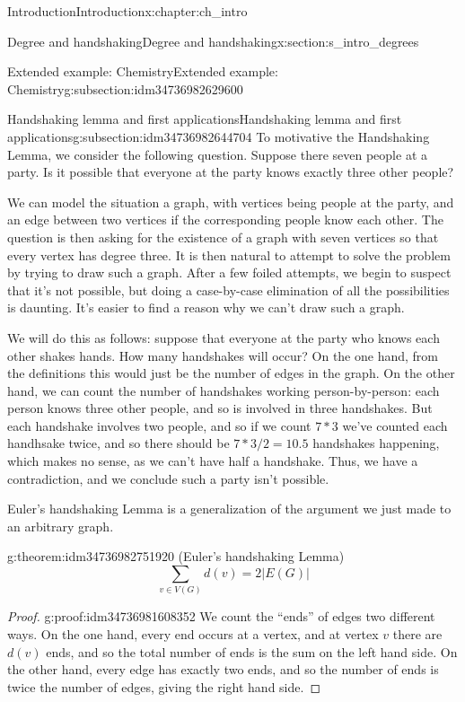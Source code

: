 \documentclass[oneside,10pt,]{book}
\numberwithin{equation}{section}
\begin{document}
\begin{chapterptx}{Introduction}{}{Introduction}{}{}{x:chapter:ch_intro}
\begin{sectionptx}{Degree and handshaking}{}{Degree and handshaking}{}{}{x:section:s_intro_degrees}
\begin{subsectionptx}{Extended example: Chemistry}{}{Extended example: Chemistry}{}{}{g:subsection:idm34736982629600}
%
\end{subsectionptx}
%
%
\typeout{************************************************}
\typeout{************************************************}
%
\begin{subsectionptx}{Handshaking lemma and first applications}{}{Handshaking lemma and first applications}{}{}{g:subsection:idm34736982644704}
To motivative the Handshaking Lemma, we consider the following question.  Suppose there seven people at a party.  Is it possible that everyone at the party knows exactly three other people?%
\par
We can model the situation a graph, with vertices being people at the party, and an edge between two vertices if the corresponding people know each other.  The question is then asking for the existence of a graph with seven vertices so that every vertex has degree three.  It is then natural to attempt to solve the problem by trying to draw such a graph.  After a few foiled attempts, we begin to suspect that it's not possible, but doing a case-by-case elimination of all the possibilities is daunting.  It's easier to find a reason why we can't draw such a graph.%
\par
We will do this as follows: suppose that everyone at the party who knows each other shakes hands.  How many handshakes will occur?  On the one hand, from the definitions this would just be the number of edges in the graph.  On the other hand, we can count the number of handshakes working person-by-person: each person knows three other people, and so is involved in three handshakes.  But each handshake involves two people, and so if we count \(7*3\) we've counted each handhsake twice, and so there should be \(7*3/2=10.5\) handshakes happening, which makes no sense, as we can't have half a handshake.  Thus, we have a contradiction, and we conclude such a party isn't possible.%
\par
Euler's handshaking Lemma is a generalization of the argument we just made to an arbitrary graph.%
\begin{theorem}{}{}{g:theorem:idm34736982751920}%
(Euler's handshaking Lemma)%
%
\begin{equation*}
\sum_{v\in V(G)}d(v)=2|E(G)|
\end{equation*}
\end{theorem}
\begin{proof}{}{g:proof:idm34736981608352}
We count the ``ends'' of edges two different ways.  On the one hand, every end occurs at a vertex, and at vertex \(v\) there are \(d(v)\) ends, and so the total number of ends is the sum on the left hand side. On the other hand, every edge has exactly two ends, and so the number of ends is twice the number of edges, giving the right hand side.%

\end{proof}
\end{subsectionptx}
\end{sectionptx}
\end{chapterptx}
\end{document}
